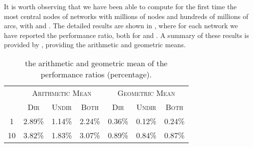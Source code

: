 \documentclass{acm_proc_article-sp}
\begin{document}
It is worth observing that we have been able to compute for the first time the  most central nodes of networks with millions of nodes and hundreds of millions of arcs, with  and . The detailed results are shown in , where for each network we have reported the performance ratio, both for  and . A summary of these results is provided by , providing the arithmetic and geometric means.

\begin{table}[t]
\caption{the arithmetic and geometric mean of the performance ratios (percentage).}
\label{tab:mean}
\centering
\begin{scriptsize}
\begin{tabular}{|c|r|r|r|r|r|r|}
\hline
 & \multicolumn{3}{c|}{\textsc{Arithmetic Mean}} & \multicolumn{3}{c|}{\textsc{Geometric Mean}} \\
 & \multicolumn{1}{c|}{\textsc{Dir}} & \multicolumn{1}{c|}{\textsc{Undir}} & \multicolumn{1}{c|}{\textsc{Both}} & \multicolumn{1}{c|}{\textsc{Dir}} & \multicolumn{1}{c|}{\textsc{Undir}} & \multicolumn{1}{c|}{\textsc{Both}} \\
\hline
1 & 2.89\% & 1.14\% & 2.24\%  & 0.36\% & 0.12\%  & 0.24\% \\
\hline
10 & 3.82\% & 1.83\% & 3.07\%  & 0.89\% & 0.84\% & 0.87\% \\
\hline
\end{tabular}
\end{scriptsize}
\end{table}
\end{document}
